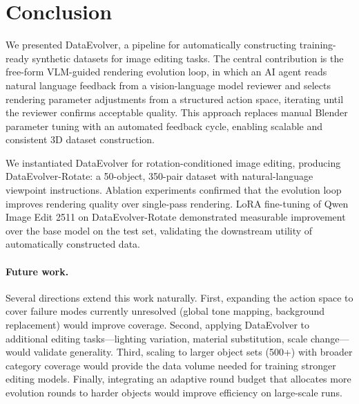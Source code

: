 \section{Conclusion}
\label{sec:conclusion}

We presented DataEvolver, a pipeline for automatically constructing training-ready
synthetic datasets for image editing tasks.
The central contribution is the free-form VLM-guided rendering evolution loop,
in which an AI agent reads natural language feedback from a vision-language model reviewer
and selects rendering parameter adjustments from a structured action space,
iterating until the reviewer confirms acceptable quality.
This approach replaces manual Blender parameter tuning with an automated feedback cycle,
enabling scalable and consistent 3D dataset construction.

We instantiated DataEvolver for rotation-conditioned image editing,
producing DataEvolver-Rotate: a 50-object, 350-pair dataset
with natural-language viewpoint instructions.
Ablation experiments confirmed that the evolution loop improves rendering quality
over single-pass rendering.
LoRA fine-tuning of Qwen Image Edit 2511 on DataEvolver-Rotate
demonstrated measurable improvement over the base model on the test set,
validating the downstream utility of automatically constructed data.

\paragraph{Future work.}
Several directions extend this work naturally.
First, expanding the action space to cover failure modes currently unresolved
(global tone mapping, background replacement) would improve coverage.
Second, applying DataEvolver to additional editing tasks---lighting variation,
material substitution, scale change---would validate generality.
Third, scaling to larger object sets (500+) with broader category coverage
would provide the data volume needed for training stronger editing models.
Finally, integrating an adaptive round budget that allocates more evolution rounds
to harder objects would improve efficiency on large-scale runs.
